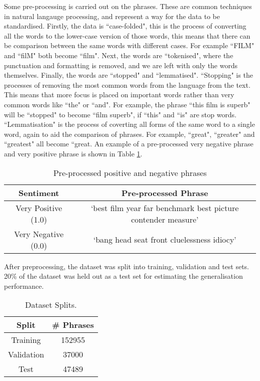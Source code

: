 \documentclass{article}
\begin{document}
Some pre-processing is carried out on the phrases. These are common techniques in natural langauge processing, and represent a way for the data to be standardised. Firstly, the data is ``case-folded", this is the process of converting all the words to the lower-case version of those words, this means that there can be comparison between the same words with different cases. For example ``FILM" and ``filM" both become ``film". Next, the words are ``tokenised", where the punctuation and formatting is removed, and we are left with only the words themselves. Finally, the words are ``stopped" and ``lemmatised". ``Stopping" is the processes of removing the most common words from the language from the text. This means that more focus is placed on important words rather than very common words like ``the" or ``and". For example, the phrase ``this film is superb" will be ``stopped" to become ``film superb", if ``this" and ``is" are stop words. ``Lemmatisation" is the process of coverting all forms of the same word to a single word, again to aid the comparison of phrases. For example, ``great", ``greater" and ``greatest" all become ``great. An example of a pre-processed very negative phrase and very positive phrase is shown in Table \ref{tab:pre-proc}.

\begin{table}[h]
    \centering
    \begin{tabular}{|c|c|}
        \hline
         \textbf{Sentiment} & \textbf{Pre-processed Phrase} \\
         \hline
         Very Positive (1.0) & `best film year far benchmark best picture contender measure'\\
         \hline
         Very Negative (0.0) & `bang head seat front cluelessness idiocy'\\
         \hline
    \end{tabular}
    \caption{Pre-processed positive and negative phrases}
    \label{tab:pre-proc}
\end{table}

After preprocessing, the dataset was split into training, validation and test sets. 20\% of the dataset was held out as a test set for estimating the generalisation performance. 

\begin{table}[H]
\centering
\begin{tabular}{|cc|}
\hline
Split       & \# Phrases \\ \hline
Training    & 152955 \\
Validation & 37000 \\
Test        & 47489 \\ \hline
\end{tabular}%
\caption{Dataset Splits.}
\label{tab:splits}
\end{table}
\end{document}
